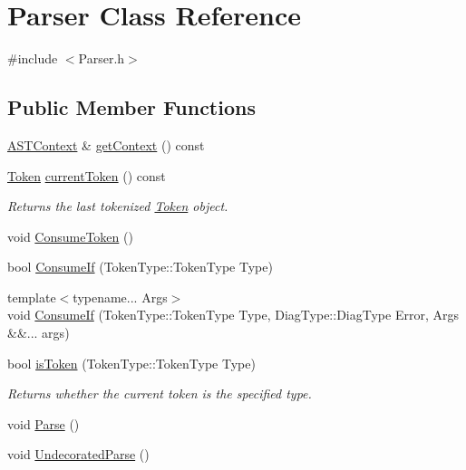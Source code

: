 \hypertarget{class_parser}{}\section{Parser Class Reference}
\label{class_parser}


{\ttfamily \#include $<$Parser.\+h$>$}

\subsection*{Public Member Functions}
\begin{DoxyCompactItemize}
\item 
\mbox{\hyperlink{class_a_s_t_context}{A\+S\+T\+Context}} \& \mbox{\hyperlink{class_parser_a65b2904aef56312309daed77baa619fa}{get\+Context}} () const
\item 
\mbox{\label{class_parser_a594d1c85e8dd24409f2f8bc278336c16}} 
\mbox{\hyperlink{class_token}{Token}} \mbox{\hyperlink{class_parser_a594d1c85e8dd24409f2f8bc278336c16}{current\+Token}} () const
\begin{DoxyCompactList}\small\item\em Returns the last tokenized \mbox{\hyperlink{class_token}{Token}} object. \end{DoxyCompactList}\item 
void \mbox{\hyperlink{class_parser_a8d2f5841105233ab7fb81011e6fdc9a4}{Consume\+Token}} ()
\item 
bool \mbox{\hyperlink{class_parser_aface90ca5edbe4709e3aed46250062da}{Consume\+If}} (Token\+Type\+::\+Token\+Type Type)
\item 
{\footnotesize template$<$typename... Args$>$ }\\void \mbox{\hyperlink{class_parser_a692cce2c9f518b58f95ee6d5471423b7}{Consume\+If}} (Token\+Type\+::\+Token\+Type Type, Diag\+Type\+::\+Diag\+Type Error, Args \&\&... args)
\item 
\mbox{\label{class_parser_ab3a7174728861132c7439a4df5f2c85a}} 
bool \mbox{\hyperlink{class_parser_ab3a7174728861132c7439a4df5f2c85a}{is\+Token}} (Token\+Type\+::\+Token\+Type Type)
\begin{DoxyCompactList}\small\item\em Returns whether the current token is the specified type. \end{DoxyCompactList}\item 
void \mbox{\hyperlink{class_parser_aa55266b2875ee4ab02f8b311a56e7fc3}{Parse}} ()
\item 
void \mbox{\hyperlink{class_parser_ad0aa1454babab9d013c7e681318b5750}{Undecorated\+Parse}} ()
\end{DoxyCompactItemize}
